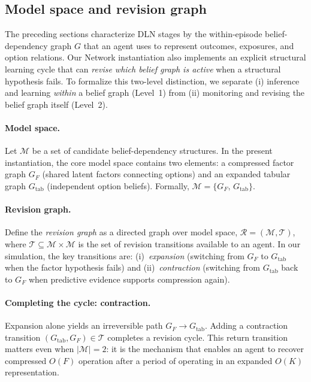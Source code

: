 
\subsection{Model space and revision graph}\label{sec:model_space}

The preceding sections characterize DLN stages by the within-episode
belief-dependency graph $G$ that an agent uses to represent outcomes, exposures,
and option relations.  Our Network instantiation also implements an explicit
structural learning cycle that can \emph{revise which belief graph is active}
when a structural hypothesis fails.  To formalize this two-level distinction, we
separate (i) inference and learning \emph{within} a belief graph (Level~1) from
(ii) monitoring and revising the belief graph itself (Level~2).

\paragraph{Model space.}
Let $\mathcal{M}$ be a set of candidate belief-dependency structures.  In the
present instantiation, the core model space contains two elements:
a compressed factor graph $G_F$ (shared latent factors connecting options) and
an expanded tabular graph $G_{\mathrm{tab}}$ (independent option beliefs).
Formally, $\mathcal{M}=\{G_F,\,G_{\mathrm{tab}}\}$.

\paragraph{Revision graph.}
Define the \emph{revision graph} as a directed graph over model space,
$\mathcal{R}=(\mathcal{M},\mathcal{T})$, where $\mathcal{T}\subseteq
\mathcal{M}\times\mathcal{M}$ is the set of revision transitions available to an
agent.  In our simulation, the key transitions are:
(i)~\emph{expansion} (switching from $G_F$ to $G_{\mathrm{tab}}$ when the factor
hypothesis fails) and (ii)~\emph{contraction} (switching from $G_{\mathrm{tab}}$
back to $G_F$ when predictive evidence supports compression again).

\paragraph{Completing the cycle: contraction.}
Expansion alone yields an irreversible path $G_F \rightarrow
G_{\mathrm{tab}}$.  Adding a contraction transition
$(G_{\mathrm{tab}},G_F)\in\mathcal{T}$ completes a revision cycle.  This return
transition matters even when $|\mathcal{M}|=2$: it is the mechanism that
enables an agent to recover compressed $O(F)$ operation after a period of
operating in an expanded $O(K)$ representation.

